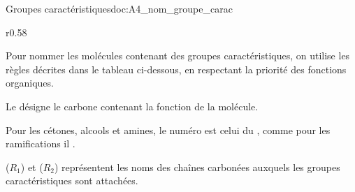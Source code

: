 \begin{doc}{Groupes caractéristiques}{doc:A4_nom_groupe_carac}
  \vspace*{-4pt}
  \begin{wrapfigure}[5]{r}{0.58\linewidth}
    \vspace*{-30pt}
    \centering
  \end{wrapfigure}
  Pour nommer les molécules contenant des groupes caractéristiques, on utilise les règles décrites dans le tableau ci-dessous, en respectant la priorité des fonctions organiques.
  
  \begin{importants}
    Le  désigne le carbone contenant la fonction de la molécule.
  \end{importants}
  
  Pour les cétones, alcools et amines, le numéro est celui du , comme pour les ramifications il .
  
  ($R_1$) et ($R_2$) représentent les noms des chaînes carbonées auxquels les groupes caractéristiques sont attachées. 


\end{doc}
